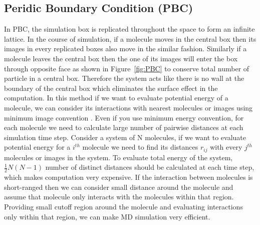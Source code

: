 \subsection{Peridic Boundary Condition (PBC)}
In PBC, the simulation box is replicated throughout the space to form an infinite lattice. In the course of simulation, if a molecule moves in the central box then its images in every replicated boxes also move in the similar fashion. Similarly if a molecule leaves the central box then the one of its images will enter the box through opposite face as shown in Figure~\ref{fig:PBC} to conserve total number of particle in a central box. Therefore the system acts like there is no wall at the boundary of the central box which eliminates the surface effect in the computation. In this method if we want to evaluate potential energy of a molecule, we can consider its interactions with nearest molecules or images using minimum image convention \cite{Allen04}. Even if you use minimum energy convention, for each molecule we need to calculate large number of pairwise distances at each simulation time step. Consider a system of N molecules, if we want to evaluate potential energy for a $i^{th}$ molecule we need to find its distances $r_{ij}$ with every $j^{th}$ molecules or images in the system. To evaluate total energy of the system, $\frac{1}{2} N (N-1)$ number of distinct distances should be calculated at each time step, which makes computation very expensive. If the interaction between molecules is short-ranged then we can consider small distance around the molecule and assume that molecule only interacts with the molecules within that region. Providing small cutoff region around the molecule and evaluating interactions only within that region, we can make MD simulation very efficient.  

